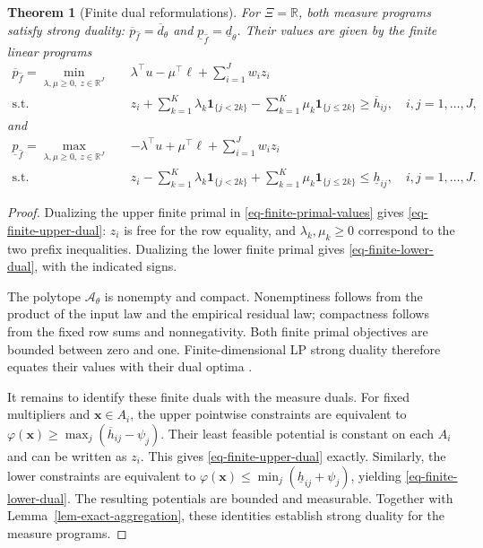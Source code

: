 \documentclass[review,11pt,3p,authoryear,nopreprintline]{elsarticle}
\newtheorem{theorem}{Theorem}
\begin{document}
\begin{theorem}[Finite dual reformulations]
  \label{thm-finite-dual-reformulations}
  For $\Xi=\mathbb R$, both measure programs satisfy strong duality:
  $\overline p_{\hat f}=\overline d_\theta$ and
  $\underline p_{\hat f}=\underline d_\theta$. Their values are given by the finite linear programs
  \begin{equation}
    \begin{aligned}
      \overline p_{\hat f}=\min_{\lambda,\mu\ge0,\ z\in\mathbb R^J}\quad&
      \lambda^\top u-\mu^\top\ell+\sum_{i=1}^Jw_i z_i\\
      \text{s.t.}\quad&
      z_i+\sum_{k=1}^K\lambda_k\mathbf1_{\{j<2k\}}
      -\sum_{k=1}^K\mu_k\mathbf1_{\{j\le2k\}}
      \ge\overline h_{ij},
      \quad i,j=1,\ldots,J,
    \end{aligned}
    \label{eq-finite-upper-dual}
  \end{equation}
  and
  \begin{equation}
    \begin{aligned}
      \underline p_{\hat f}=\max_{\lambda,\mu\ge0,\ z\in\mathbb R^J}\quad&
      -\lambda^\top u+\mu^\top\ell+\sum_{i=1}^Jw_i z_i\\
      \text{s.t.}\quad&
      z_i-\sum_{k=1}^K\lambda_k\mathbf1_{\{j<2k\}}
      +\sum_{k=1}^K\mu_k\mathbf1_{\{j\le2k\}}
      \le\underline h_{ij},
      \quad i,j=1,\ldots,J.
    \end{aligned}
    \label{eq-finite-lower-dual}
  \end{equation}
\end{theorem}
\begin{proof}
  Dualizing the upper finite primal in \eqref{eq-finite-primal-values} gives \eqref{eq-finite-upper-dual}: $z_i$ is free for the row equality, and $\lambda_k,\mu_k\ge0$ correspond to the two prefix inequalities. Dualizing the lower finite primal gives \eqref{eq-finite-lower-dual}, with the indicated signs.

  The polytope $\mathcal A_\theta$ is nonempty and compact. Nonemptiness follows from the product of the input law and the empirical residual law; compactness follows from the fixed row sums and nonnegativity. Both finite primal objectives are bounded between zero and one. Finite-dimensional LP strong duality therefore equates their values with their dual optima \citep{B.V04}.

  It remains to identify these finite duals with the measure duals. For fixed multipliers and $\bm x\in A_i$, the upper pointwise constraints are equivalent to
  $\varphi(\bm x)\ge\max_j(\overline h_{ij}-\psi_j)$.
  Their least feasible potential is constant on each $A_i$ and can be written as $z_i$. This gives \eqref{eq-finite-upper-dual} exactly. Similarly, the lower constraints are equivalent to
  $\varphi(\bm x)\le\min_j(\underline h_{ij}+\psi_j)$,
  yielding \eqref{eq-finite-lower-dual}. The resulting potentials are bounded and measurable. Together with Lemma~\ref{lem-exact-aggregation}, these identities establish strong duality for the measure programs.
\end{proof}
\end{document}
